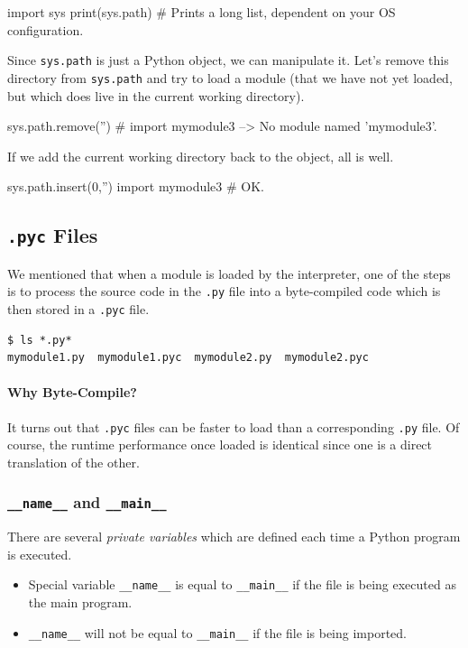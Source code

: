 \documentclass[12pt,letterpaper,twoside]{article}
\begin{document}
\begin{enumerate}
\begin{python}
import sys
print(sys.path)   # Prints a long list, dependent on your OS configuration. 
\end{python}

Since \texttt{sys.path} is just a Python object, we can manipulate it.
Let's remove this directory from \texttt{sys.path} and try to load a
module (that we have not yet loaded, but which does live in the current working directory).

\begin{python}
sys.path.remove('')
# import mymodule3  --> No module named 'mymodule3'.
\end{python}

If we add the current working directory back to the object, all is well.

\begin{python}
sys.path.insert(0,'')
import mymodule3   # OK.
\end{python}

\subsection{\texttt{.pyc} Files}

We mentioned that when a module is loaded by the interpreter, one of the steps is to
process the source code in the \texttt{.py} file into a byte-compiled code which is
then stored in a \texttt{.pyc} file.

\begin{verbatim}
$ ls *.py*
mymodule1.py  mymodule1.pyc  mymodule2.py  mymodule2.pyc
\end{verbatim}

\paragraph{Why Byte-Compile?} It turns out that \texttt{.pyc} files can be faster
to load than a corresponding \texttt{.py} file. Of course, the runtime performance once
loaded is identical since one is a direct translation of the other.

\subsubsection{\texttt{\_\_name\_\_} and \texttt{\_\_main\_\_}}
There are several \emph{private variables} which are defined each time a Python program
is executed.

\begin{itemize}
\item
  Special variable \texttt{\_\_name\_\_} is equal to
  \texttt{\_\_main\_\_} if the file is being executed as the main
  program.
\item
  \texttt{\_\_name\_\_} will not be equal to \texttt{\_\_main\_\_} if
  the file is being imported.
\end{itemize}


\end{enumerate}
\end{document}

